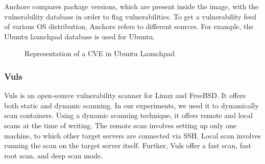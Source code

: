 \documentclass[a4paper,num-refs]{oup-contemporary}
\begin{document}
Anchore compares package versions, which are present inside the
image, with the vulnerability database in order to flag vulnerabilities.
To get a vulnerability feed of various OS distribution, Anchore refers to
different sources. For example, the Ubuntu launchpad database is used for Ubuntu.

\begin{figure}[!ht]
        \caption{\label{example} Representation of a CVE in Ubuntu Launchpad}
\end{figure}

\subsubsection{Vuls}

Vuls is an open-source vulnerability scanner for Linux and FreeBSD.
It offers both static and dynamic scanning. In our experiments, we used
it to dynamically scan containers.
Using a dynamic scanning technique, it offers
remote and local scans at the time of writing. The remote scan involves setting up only one machine, to
which other target servers are connected via SSH. Local scan involves running
the scan on the target server itself. Further, Vuls offer a fast scan, fast root scan,
and deep scan mode.
\end{document}
